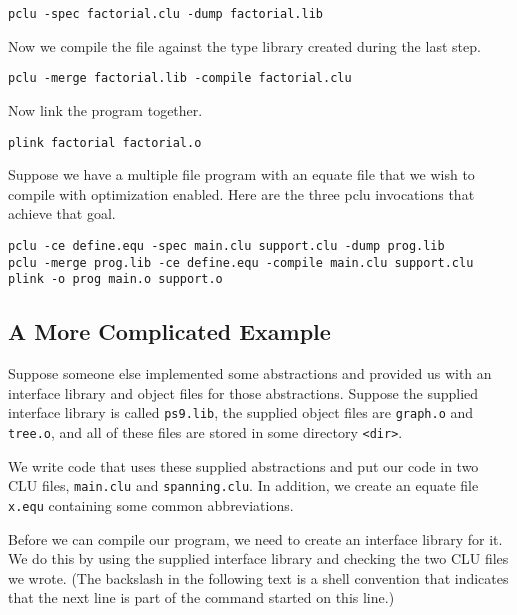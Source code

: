 \begin{indenttext}
\verb|pclu -spec factorial.clu -dump factorial.lib|
\end{indenttext}

\noindent Now we compile the file against the type library created
during the last step.

\begin{indenttext}
\verb|pclu -merge factorial.lib -compile factorial.clu|
\end{indenttext}

\noindent Now link the program together.

\begin{indenttext}
\verb|plink factorial factorial.o|
\end{indenttext}

\noindent Suppose we have a multiple file program with an equate file that we
wish to compile with optimization enabled. Here are the three pclu
invocations that achieve that goal.

\begin{indenttext}
  \verb|pclu -ce define.equ -spec main.clu support.clu -dump prog.lib|\\
  \verb|pclu -merge prog.lib -ce define.equ -compile main.clu support.clu|\\
  \verb|plink -o prog main.o support.o|
\end{indenttext}

\subsection{A More Complicated Example}

Suppose someone else implemented some abstractions and provided us
with an interface library and object files for those abstractions.
Suppose the supplied interface library is called \verb|ps9.lib|, the
supplied object files are \verb|graph.o| and \verb|tree.o|, and all of
these files are stored in some directory \verb|<dir>|.

We write code that uses these supplied abstractions and put our code in
two CLU files, \verb|main.clu| and \verb|spanning.clu|. In addition, we
create an equate file \verb|x.equ| containing some common
abbreviations.

Before we can compile our program, we need to create an interface
library for it. We do this by using the supplied interface library and
checking the two CLU files we wrote. (The backslash in the following
text is a shell convention that indicates that the next line is part
of the command started on this line.)

